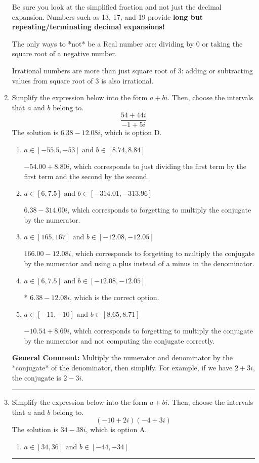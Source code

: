 \documentclass{extbook}[14pt]
\newcommand{\litem}[1]{\item #1

\rule{\textwidth}{0.4pt}}
\begin{document}
\begin{enumerate}
{ Be sure you look at the simplified fraction and not just the decimal expansion. Numbers such as 13, 17, and 19 provide \textbf{long but repeating/terminating decimal expansions!} 
 
 The only ways to *not* be a Real number are: dividing by 0 or taking the square root of a negative number. 
 
 Irrational numbers are more than just square root of 3: adding or subtracting values from square root of 3 is also irrational.
}
\litem{
Simplify the expression below into the form $a+bi$. Then, choose the intervals that $a$ and $b$ belong to.
\[ \frac{54 + 44 i}{-1 + 5 i} \]The solution is \( 6.38  - 12.08 i \), which is option D.\begin{enumerate}[label=\Alph*.]
\item \( a \in [-55.5, -53] \text{ and } b \in [8.74, 8.84] \)

 $-54.00  + 8.80 i$, which corresponds to just dividing the first term by the first term and the second by the second.
\item \( a \in [6, 7.5] \text{ and } b \in [-314.01, -313.96] \)

 $6.38  - 314.00 i$, which corresponds to forgetting to multiply the conjugate by the numerator.
\item \( a \in [165, 167] \text{ and } b \in [-12.08, -12.05] \)

 $166.00  - 12.08 i$, which corresponds to forgetting to multiply the conjugate by the numerator and using a plus instead of a minus in the denominator.
\item \( a \in [6, 7.5] \text{ and } b \in [-12.08, -12.05] \)

* $6.38  - 12.08 i$, which is the correct option.
\item \( a \in [-11, -10] \text{ and } b \in [8.65, 8.71] \)

 $-10.54  + 8.69 i$, which corresponds to forgetting to multiply the conjugate by the numerator and not computing the conjugate correctly.
\end{enumerate}

\textbf{General Comment:} Multiply the numerator and denominator by the *conjugate* of the denominator, then simplify. For example, if we have $2+3i$, the conjugate is $2-3i$.
}
\litem{
Simplify the expression below into the form $a+bi$. Then, choose the intervals that $a$ and $b$ belong to.
\[ (-10 + 2 i)(-4 + 3 i) \]The solution is \( 34 - 38 i \), which is option A.\begin{enumerate}[label=\Alph*.]
\item \( a \in [34, 36] \text{ and } b \in [-44, -34] \)


\end{enumerate}}
\end{enumerate}
\end{document}
